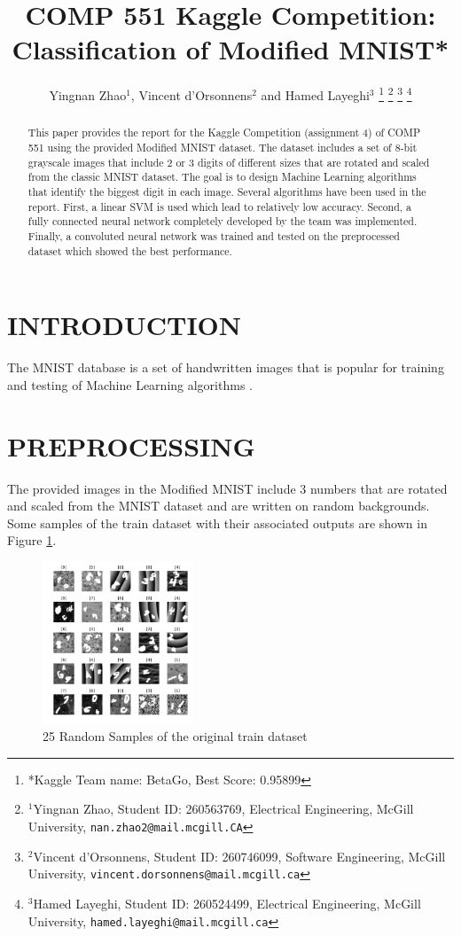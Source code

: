\documentclass[letterpaper, 10 pt, conference]{ieeeconf}  %
\title{\LARGE \bf
COMP 551 Kaggle Competition: Classification of Modified MNIST*
}
\author{Yingnan Zhao$^{1}$, Vincent d'Orsonnens$^{2}$ and Hamed Layeghi$^{3}$%
\thanks{*Kaggle Team name: BetaGo, Best Score: 0.95899}%
\thanks{$^{1}$Yingnan Zhao, Student ID: 260563769, Electrical Engineering, 
        McGill University,
        {\tt\small nan.zhao2@mail.mcgill.CA}}%
\thanks{$^{2}$Vincent d'Orsonnens, Student ID: 260746099, Software Engineering, McGill University, 
        {\tt\small vincent.dorsonnens@mail.mcgill.ca}}%
\thanks{$^{3}$Hamed Layeghi, Student ID: 260524499, Electrical Engineering, McGill University, 
	{\tt\small hamed.layeghi@mail.mcgill.ca}}%
}
\begin{document}
\maketitle
\thispagestyle{empty}
\pagestyle{empty}


\begin{abstract}
This paper provides the report for the Kaggle Competition (assignment 4) of COMP 551 using the provided Modified MNIST dataset. The dataset includes a set of 8-bit grayscale images that include 2 or 3 digits of different sizes that are rotated and scaled from the classic MNIST dataset. The goal is to design Machine Learning algorithms that identify the biggest digit in each image. Several algorithms have been used in the report. First, a linear SVM is used which lead to relatively low accuracy. Second, a fully connected neural network completely developed by the team was implemented. Finally, a convoluted neural network was trained and tested on the preprocessed dataset which showed the best performance.  
\end{abstract}


\section{INTRODUCTION}

The MNIST database \cite{MNISTcreators} is a set of handwritten images that is popular for training and testing of Machine Learning algorithms \cite{wiki:MNIST}.

\section{PREPROCESSING}
The provided images in the Modified MNIST include 3 numbers that are rotated and scaled from the MNIST dataset and are written on random backgrounds.
Some samples of the train dataset with their associated outputs are shown in Figure \ref{fig:original}.
\begin{figure}[h]
	\begin{center}
		\includegraphics[width=0.4\textwidth]{figures/originalDataset.pdf}  %
		\caption{25 Random Samples of the original train dataset}
		\label{fig:original}
	\end{center}
\end{figure}
\end{document}
